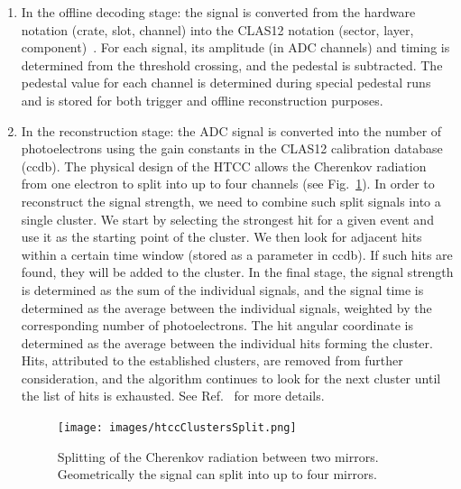 \begin{enumerate}
\item In the offline decoding stage: the signal is converted from the hardware notation (crate, slot, channel) into the
  CLAS12 notation (sector, layer, component)~\cite{recon-nim}. For each signal, its amplitude (in ADC channels) and
  timing is determined from the threshold crossing, and the pedestal is subtracted. The pedestal value for each
  channel is determined during special pedestal runs and is stored for both trigger and offline reconstruction
  purposes.
\item In the reconstruction stage: the ADC signal is converted into the number of photoelectrons using the
  gain constants in the CLAS12 calibration database (ccdb). The physical design of the HTCC allows the Cherenkov
  radiation from one electron to split into up to four channels (see Fig.~\ref{fig:htccClustersSplit}). In order to
  reconstruct the signal strength, we need to combine such split signals into a single cluster. We start by selecting
  the strongest hit for a given event and use it as the starting point of the cluster. We then look for adjacent hits
  within a certain time window (stored as a parameter in ccdb). If such hits are found, they will be added to
  the cluster. In the final stage, the signal strength is determined as the sum of the individual signals, and the signal
  time is determined as the average between the individual signals, weighted by the corresponding number of 
  photoelectrons. The hit angular coordinate is determined as the average between the individual hits forming the
  cluster. Hits, attributed to the established clusters, are removed from further consideration, and the algorithm
  continues to look for the next cluster until the list of hits is exhausted. See Ref.~\cite{recon-nim} for more
  details.

\begin{figure}[ht]
\centering
\texttt{[image: images/htccClustersSplit.png]}
\caption{Splitting of the Cherenkov radiation between two mirrors. Geometrically the signal can split into up to four
  mirrors.}
\label{fig:htccClustersSplit}
\end{figure}
\end{enumerate}
